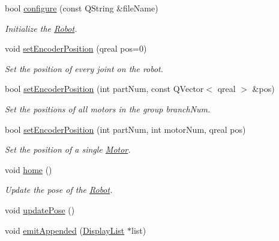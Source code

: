 \begin{DoxyCompactItemize}
bool \hyperlink{class_robot_model_1_1_robot_a9ca9887b212f3233d101d95854cf2c79}{configure} (const QString \&fileName)
\begin{DoxyCompactList}\small\item\em Initialize the \hyperlink{class_robot_model_1_1_robot}{Robot}. \item\end{DoxyCompactList}\item 
void \hyperlink{class_robot_model_1_1_robot_a72ff62b72e0e9d34d3ca0c241dec50d3}{setEncoderPosition} (qreal pos=0)
\begin{DoxyCompactList}\small\item\em Set the position of every joint on the robot. \item\end{DoxyCompactList}\item 
bool \hyperlink{class_robot_model_1_1_robot_ad68d3bd2d8edbca49704f8a5b01055a1}{setEncoderPosition} (int partNum, const QVector$<$ qreal $>$ \&pos)
\begin{DoxyCompactList}\small\item\em Set the positions of all motors in the group branchNum. \item\end{DoxyCompactList}\item 
bool \hyperlink{class_robot_model_1_1_robot_a08017bce09f838437534aec53d615ff6}{setEncoderPosition} (int partNum, int motorNum, qreal pos)
\begin{DoxyCompactList}\small\item\em Set the position of a single \hyperlink{class_robot_model_1_1_motor}{Motor}. \item\end{DoxyCompactList}\item 
void \hyperlink{class_robot_model_1_1_robot_a2fd7c2a0cd53593361f38f52de41d73c}{home} ()
\begin{DoxyCompactList}\small\item\em Update the pose of the \hyperlink{class_robot_model_1_1_robot}{Robot}. \item\end{DoxyCompactList}\item 
void \hyperlink{class_robot_model_1_1_robot_a7338994f0ab4baa6e5d08751272b63ca}{updatePose} ()
\item 
void \hyperlink{class_robot_model_1_1_robot_a4c006ead68b20137a28276920103667c}{emitAppended} (\hyperlink{class_robot_model_1_1_display_list}{DisplayList} $\ast$list)
\end{DoxyCompactItemize}
